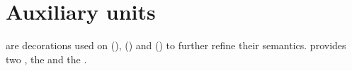 
\section{Auxiliary units}\label{sec:aux}

 are decorations used on  (),  ()  and  () to further refine their semantics.  \SBGNERLone{} provides two , the  and the .



